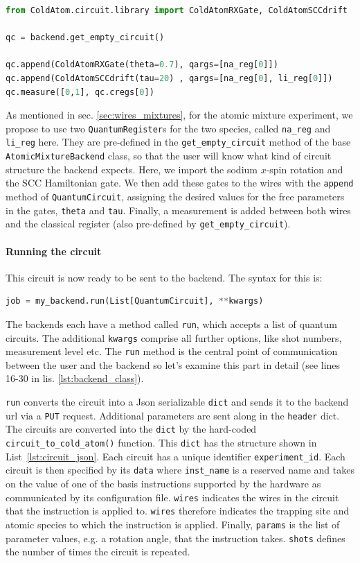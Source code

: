 \documentclass[a4paper, 10pt]{article}
\newcommand{\co}[1]{\texttt{#1}}
\begin{document}
\begin{lstlisting}[language=Python, caption = example for defining a quantum circuit, label = {lst:circuit_definition}]
from ColdAtom.circuit.library import ColdAtomRXGate, ColdAtomSCCdrift

qc = backend.get_empty_circuit()

qc.append(ColdAtomRXGate(theta=0.7), qargs=[na_reg[0]])
qc.append(ColdAtomSCCdrift(tau=20) , qargs=[na_reg[0], li_reg[0]])
qc.measure([0,1], qc.cregs[0])
\end{lstlisting}

As mentioned in sec. \ref{sec:wires_mixtures}, for the atomic mixture experiment, we propose to use two \co{QuantumRegister}s for the two species, called \co{na\_reg} and \co{li\_reg} here.
They are pre-defined in the \co{get\_empty\_circuit} method of the base \co{AtomicMixtureBackend} class, so that the user will know what kind of circuit structure the backend expects. 
Here, we import the sodium $x$-spin rotation and the SCC Hamiltonian gate.
We then add these gates to the wires with the \co{append} method of \co{QuantumCircuit}, assigning the desired values for the free parameters in the gates, \co{theta} and \co{tau}.
Finally, a measurement is added between both wires and the classical register (also pre-defined by \co{get\_empty\_circuit}).

\paragraph{Running the circuit}
\noindent This circuit is now ready to be sent to the backend. The syntax for this is:
\begin{lstlisting}[language=Python]
job = my_backend.run(List[QuantumCircuit], **kwargs)
\end{lstlisting}
The backends each have a method called \co{run}, which accepts a list of quantum circuits. The additional \co{kwargs} comprise all further options, like shot numbers, measurement level etc. 
The \co{run} method is the central point of communication between the user and the backend so let's examine this part in detail (see lines 16-30 in lis. \ref{lst:backend_class}).

\co{run} converts the circuit into a Json serializable \co{dict} and sends it to the backend url via a \co{PUT} request. Additional parameters are sent along in the \co{header} dict.
The circuits are converted into the \co{dict} by the hard-coded \co{circuit\_to\_cold\_atom()} function.
This \co{dict} has the structure shown in List~\ref{lst:circuit_json}.
Each circuit has a unique identifier \co{experiment\_id}.
Each circuit is then specified by its \co{data} where \co{inst\_name} is a reserved name and takes on the value of one of the basis instructions supported by the hardware as communicated by its configuration file.
\co{wires} indicates the wires in the circuit that the instruction is applied to.
\co{wires} therefore indicates the trapping site and atomic species to which the instruction is applied.
Finally, \co{params} is the list of parameter values, e.g. a rotation angle, that the instruction takes.
\co{shots} defines the number of times the circuit is repeated.
\end{document}
